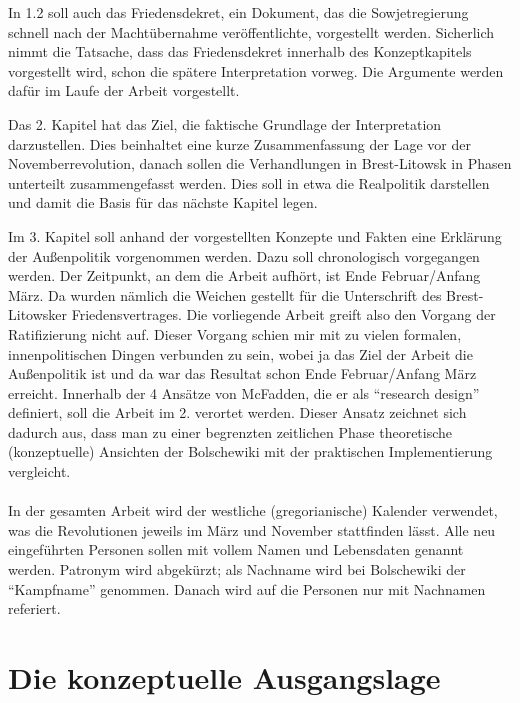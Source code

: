 \documentclass[12pt,headsepline,a4paper]{scrartcl}
\begin{document}
In 1.2 soll auch das Friedensdekret, ein Dokument, das die Sowjetregierung schnell nach der Machtübernahme veröffentlichte, vorgestellt werden. Sicherlich nimmt die Tatsache, dass das Friedensdekret innerhalb des Konzeptkapitels vorgestellt wird, schon die spätere Interpretation vorweg. Die Argumente werden dafür im Laufe der Arbeit vorgestellt.

Das 2. Kapitel hat das Ziel, die faktische Grundlage der Interpretation darzustellen. Dies beinhaltet eine kurze Zusammenfassung der Lage vor der Novemberrevolution, danach sollen die Verhandlungen in Brest-Litowsk in Phasen unterteilt zusammengefasst werden. Dies soll in etwa die Realpolitik darstellen und damit die Basis für das nächste Kapitel legen. 

Im 3. Kapitel soll anhand der vorgestellten Konzepte und Fakten eine Erklärung der Außenpolitik vorgenommen werden. Dazu soll chronologisch vorgegangen werden. Der Zeitpunkt, an dem die Arbeit aufhört, ist Ende Februar/Anfang März. Da wurden nämlich die Weichen gestellt für die Unterschrift des Brest-Litowsker Friedensvertrages. Die vorliegende Arbeit greift also den Vorgang der Ratifizierung nicht auf. Dieser Vorgang schien mir mit zu vielen formalen, innenpolitischen Dingen verbunden zu sein, wobei ja das Ziel der Arbeit die Außenpolitik ist und da war das Resultat schon Ende Februar/Anfang März erreicht.
Innerhalb der 4 Ansätze von McFadden\autocite{fadden1993}, die er als "`research design"' definiert, soll die Arbeit im 2. verortet werden. Dieser Ansatz zeichnet sich dadurch aus, dass man zu einer  begrenzten zeitlichen Phase theoretische (konzeptuelle) Ansichten der Bolschewiki mit der praktischen Implementierung vergleicht. 
\\\\
In der gesamten Arbeit wird der westliche (gregorianische) Kalender  verwendet, was die Revolutionen jeweils im März und November stattfinden lässt. Alle neu eingeführten Personen sollen mit vollem Namen und Lebensdaten genannt werden. Patronym wird abgekürzt; als Nachname wird bei Bolschewiki der "`Kampfname"' genommen. Danach wird auf die Personen nur mit Nachnamen referiert.


\newpage
\section{Die konzeptuelle Ausgangslage}
\end{document}
